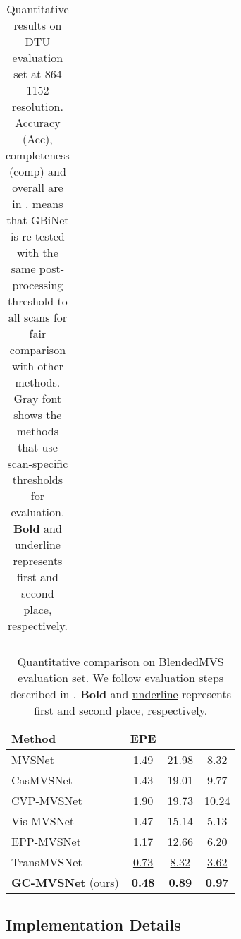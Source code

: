 \documentclass[10pt,twocolumn,letterpaper]{article}
\begin{document}
\begin{table}[t]
\begin{center}
{{\begin{tabular}{clccc}
\bottomrule
\end{tabular}
}}
\vspace{-6pt}
\caption{Quantitative results on DTU evaluation set at 864  1152 resolution. Accuracy (Acc), completeness (comp) and overall are in .  means that GBiNet is re-tested with the same post-processing threshold to all scans for fair comparison with other methods. Gray font shows the methods that use scan-specific thresholds for evaluation. \textbf{Bold} and \underline{underline} represents first and second place, respectively.}
\label{Table:DTU-model-comparison}
\vspace{-22pt}
\end{center}
\end{table}

\begin{table}[t]
  \begin{center}
    {\footnotesize{
\begin{tabular}{lccc}
    \toprule
    Method  & EPE  &  & \\
    \midrule
    MVSNet \cite{yao2018mvsnet} & 1.49  &  21.98 &  8.32 \\
    CasMVSNet \cite{gu2019casmvsnet} &  1.43 & 19.01  &  9.77 \\
    CVP-MVSNet \cite{yang2019CVPMVS} &  1.90 & 19.73  & 10.24  \\
    Vis-MVSNet \cite{Zhang2020visibility} & 1.47  & 15.14  &  5.13 \\
    EPP-MVSNet \cite{ma2021eppMVS} & 1.17  & 12.66 &  6.20 \\
    TransMVSNet \cite{ding2022transmvsnet} & \underline{0.73} & \underline{8.32} & \underline{3.62} \\
    \midrule
\textbf{GC-MVSNet} (ours) & \textbf{0.48}  & \textbf{0.89}  &  \textbf{0.97} \\
    \bottomrule
\end{tabular}
}}
\vspace{-6pt}
\caption{Quantitative comparison on BlendedMVS evaluation set. We follow evaluation steps described in \cite{darmon2021wildMVS}. \textbf{Bold} and \underline{underline} represents first and second place, respectively.}
\label{table:quantitative-comparison-on-blended}
\vspace{-25pt}
\end{center}
\end{table}

\vspace{-3pt}
\subsection{Implementation Details}\label{sec:implementation-details}
\end{document}
